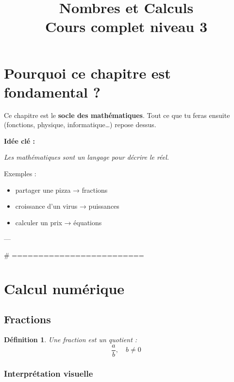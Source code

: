 \documentclass[11pt,a4paper]{article}
\title{\Huge Nombres et Calculs \\ \large Cours complet niveau 3\ieme}
\date{}
\newtheorem{definition}{Définition}
\begin{document}
\maketitle

\section{Pourquoi ce chapitre est fondamental ?}

Ce chapitre est le \textbf{socle des mathématiques}.  
Tout ce que tu feras ensuite (fonctions, physique, informatique…) repose dessus.

\textbf{Idée clé :}  
\begin{center}
\textit{Les mathématiques sont un langage pour décrire le réel.}
\end{center}

Exemples :
\begin{itemize}
\item partager une pizza → fractions
\item croissance d’un virus → puissances
\item calculer un prix → équations
\end{itemize}

---

# =========================
\section{Calcul numérique}

\subsection{Fractions}

\begin{definition}
Une fraction est un quotient :
\[
\frac{a}{b}, \quad b \neq 0
\]
\end{definition}

\subsubsection{Interprétation visuelle}

\begin{center}
\end{center}
\end{document}
